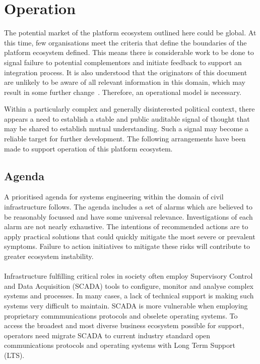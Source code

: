 \documentclass[11pt, oneside]{book}   	%
\begin{document}
\pagebreak

\chapter{Operation}
The potential market of the platform ecosystem outlined here could be global.
At this time, few organisations meet the criteria that define the boundaries of the platform ecosystem defined.
This means there is considerable work to be done to signal failure to potential complementors and initiate feedback to support an integration process.
It is also understood that the originators of this document are unlikely to be aware of all relevant information in this domain, which may result in some further change~\cite{ont1}.
Therefore, an operational model is necessary.\

Within a particularly complex and generally disinterested political context, there appears a need to establish a stable and public auditable signal of thought that may be shared to establish mutual understanding.
Such a signal may become a reliable target for further development.
The following arrangements have been made to support operation of this platform ecosystem.\

\section{Agenda}
A prioritised agenda for systems engineering within the domain of civil infrastructure follows.
The agenda includes a set of alarms which are believed to be reasonably focussed and have some universal relevance.
Investigations of each alarm are not nearly exhaustive.
The intentions of recommended actions are to apply practical solutions that could quickly mitigate the most severe or prevalent symptoms.
Failure to action initiatives to mitigate these risks will contribute to greater ecosystem instability.

\subsubsection{\color{Red}{P1: Technical Support for Supervisory Control and Data Acquisition}}

Infrastructure fulfilling critical roles in society often employ Supervisory Control and Data Acquisition (SCADA) tools to configure, monitor and analyse complex systems and processes.
In many cases, a lack of technical support is making such systems very difficult to maintain.
SCADA is more vulnerable when employing proprietary commmunications protocols and obselete operating systems.
To access the broadest and most diverse business ecosystem possible for support, operators need migrate SCADA to current industry standard open communications protocols and operating systems with Long Term Support (LTS).\
\end{document}
